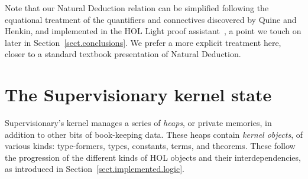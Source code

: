 \documentclass[a4paper, UKenglish, cleveref, autoref, thm-restate, colorlinks]{lipics-v2021}
\begin{document}
Note that our Natural Deduction relation can be simplified following the equational treatment of the quantifiers and connectives discovered by Quine and Henkin, and implemented in the HOL Light proof assistant~\cite{DBLP:conf/tphol/Harrison09a}, a point we touch on later in Section~\ref{sect.conclusions}.
We prefer a more explicit treatment here, closer to a standard textbook presentation of Natural Deduction.

\section{The Supervisionary kernel state}
\label{sect.the.kernel.state}

Supervisionary's kernel manages a series of \emph{heaps}, or private memories, in addition to other bits of book-keeping data.
These heaps contain \emph{kernel objects}, of various kinds: type-formers, types, constants, terms, and theorems.
These follow the progression of the different kinds of HOL objects and their interdependencies, as introduced in Section~\ref{sect.implemented.logic}.
\end{document}
